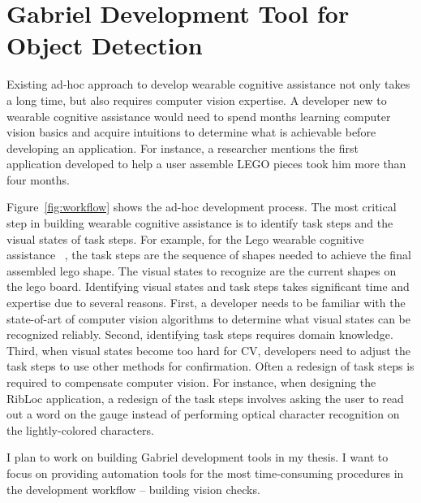 \section{Gabriel Development Tool for Object Detection}

Existing ad-hoc approach to develop wearable cognitive assistance not only takes
a long time, but also requires computer vision expertise. A developer new to
wearable cognitive assistance would need to spend months learning computer
vision basics and acquire intuitions to determine what is achievable before
developing an application. For instance, a researcher mentions the first
application developed to help a user assemble LEGO pieces took him more than
four months.


Figure~\ref{fig:workflow} shows the ad-hoc development process. The most
critical step in building wearable cognitive assistance is to identify task
steps and the visual states of task steps. For example, for the Lego wearable
cognitive assistance ~\cite{chen2017empirical}, the task steps are the sequence
of shapes needed to achieve the final assembled lego shape. The visual states to
recognize are the current shapes on the lego board. Identifying visual states
and task steps takes significant time and expertise due to several reasons.
First, a developer needs to be familiar with the state-of-art of computer vision
algorithms to determine what visual states can be recognized reliably. Second,
identifying task steps requires domain knowledge. Third, when visual states
become too hard for CV, developers need to adjust the task steps to use other
methods for confirmation. Often a redesign of task steps is required to
compensate computer vision. For instance, when designing the RibLoc application,
a redesign of the task steps involves asking the user to read out a word on the
gauge instead of performing optical character recognition on the lightly-colored
characters.

I plan to work on building Gabriel development tools in my thesis. I want to
focus on providing automation tools for the most time-consuming procedures in
the development workflow -- building vision checks.


